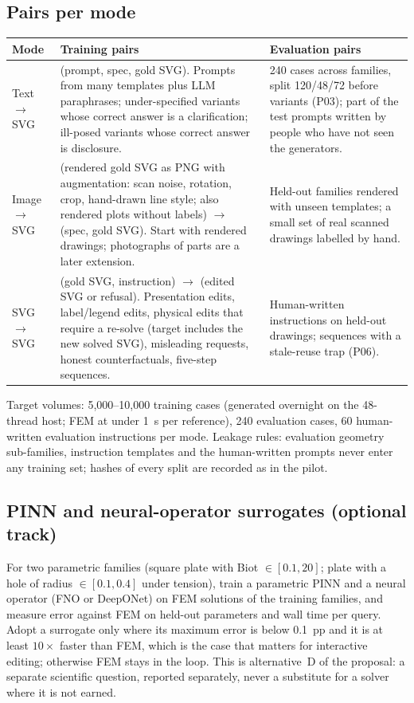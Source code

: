 \documentclass[11pt,a4paper]{article}
\begin{document}
\subsection{Pairs per mode}
\begin{longtable}{L{2.4cm} L{6.2cm} L{6.4cm}}
\toprule
Mode & Training pairs & Evaluation pairs \\
\midrule
Text $\rightarrow$ SVG & (prompt, spec, gold SVG). Prompts from many templates plus LLM paraphrases; under-specified variants whose correct answer is a clarification; ill-posed variants whose correct answer is disclosure. & 240 cases across families, split 120/48/72 before variants (P03); part of the test prompts written by people who have not seen the generators. \\
Image $\rightarrow$ SVG & (rendered gold SVG as PNG with augmentation: scan noise, rotation, crop, hand-drawn line style; also rendered plots without labels) $\rightarrow$ (spec, gold SVG). Start with rendered drawings; photographs of parts are a later extension. & Held-out families rendered with unseen templates; a small set of real scanned drawings labelled by hand. \\
SVG $\rightarrow$ SVG & (gold SVG, instruction) $\rightarrow$ (edited SVG or refusal). Presentation edits, label/legend edits, physical edits that require a re-solve (target includes the new solved SVG), misleading requests, honest counterfactuals, five-step sequences. & Human-written instructions on held-out drawings; sequences with a stale-reuse trap (P06). \\
\bottomrule
\end{longtable}

Target volumes: 5{,}000--10{,}000 training cases (generated overnight on the 48-thread host; FEM at under 1~s per reference), 240 evaluation cases, 60 human-written evaluation instructions per mode. Leakage rules: evaluation geometry sub-families, instruction templates and the human-written prompts never enter any training set; hashes of every split are recorded as in the pilot.

\subsection{PINN and neural-operator surrogates (optional track)}
For two parametric families (square plate with Biot $\in[0.1,20]$; plate with a hole of radius $\in[0.1,0.4]$ under tension), train a parametric PINN and a neural operator (FNO or DeepONet) on FEM solutions of the training families, and measure error against FEM on held-out parameters and wall time per query. Adopt a surrogate only where its maximum error is below 0.1~pp and it is at least $10\times$ faster than FEM, which is the case that matters for interactive editing; otherwise FEM stays in the loop. This is alternative~D of the proposal: a separate scientific question, reported separately, never a substitute for a solver where it is not earned.
\end{document}
